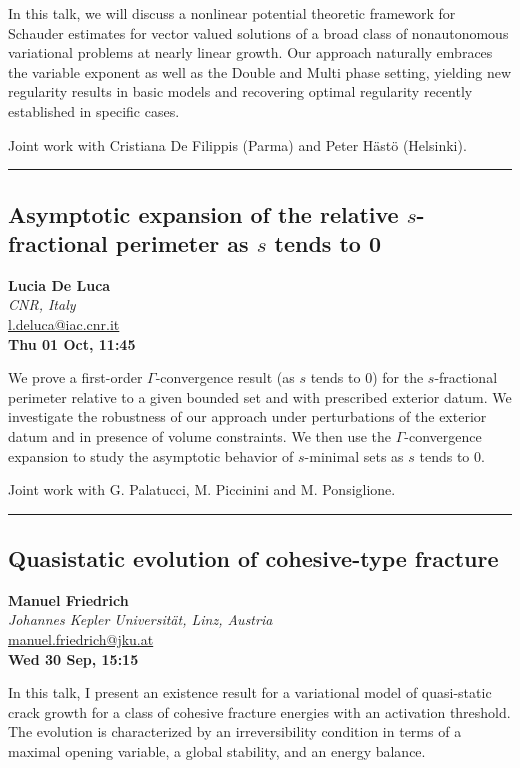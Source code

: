 \documentclass[a4paper,11pt]{article}
\begin{document}
In this talk, we will discuss a nonlinear potential theoretic framework for Schauder estimates for vector valued solutions of a broad class of nonautonomous variational problems at nearly linear growth. Our approach naturally embraces the variable exponent as well as the Double and Multi phase setting, yielding new regularity results in basic models and recovering optimal regularity recently established in specific cases.

\smallskip
Joint work with Cristiana De Filippis (Parma) and Peter Hästö (Helsinki).

\newpage

\noindent\rule{\textwidth}{0.4pt}

\begin{center}
\subsection*{Asymptotic expansion of the relative $s$-fractional perimeter as $s$ tends to 0}

\textbf{Lucia De Luca} \\
\textit{CNR, Italy} \\
\url{l.deluca@iac.cnr.it} \\
\textbf{Thu 01 Oct, 11:45}
\
\end{center}
\medskip
We prove a first-order $\Gamma$-convergence result (as $s$ tends to 0) for the $s$-fractional perimeter relative to a given bounded set and with prescribed exterior datum. We investigate the robustness of our approach under perturbations of the exterior datum and in presence of volume constraints. We then use the $\Gamma$-convergence expansion to study the asymptotic behavior of $s$-minimal sets as $s$ tends to 0.

\smallskip
Joint work with G. Palatucci, M. Piccinini and M. Ponsiglione.

\newpage

\noindent\rule{\textwidth}{0.4pt}

\begin{center}
\subsection*{Quasistatic evolution of cohesive-type fracture}

\textbf{Manuel Friedrich} \\
\textit{Johannes Kepler Universität, Linz, Austria} \\
\url{manuel.friedrich@jku.at} \\
\textbf{Wed 30 Sep, 15:15}
\
\end{center}
\medskip
In this talk, I present an existence result for a variational model of quasi-static crack growth for a class of cohesive fracture energies with an activation threshold. The evolution is characterized by an irreversibility condition in terms of a maximal opening variable, a global stability, and an energy balance.
\end{document}

